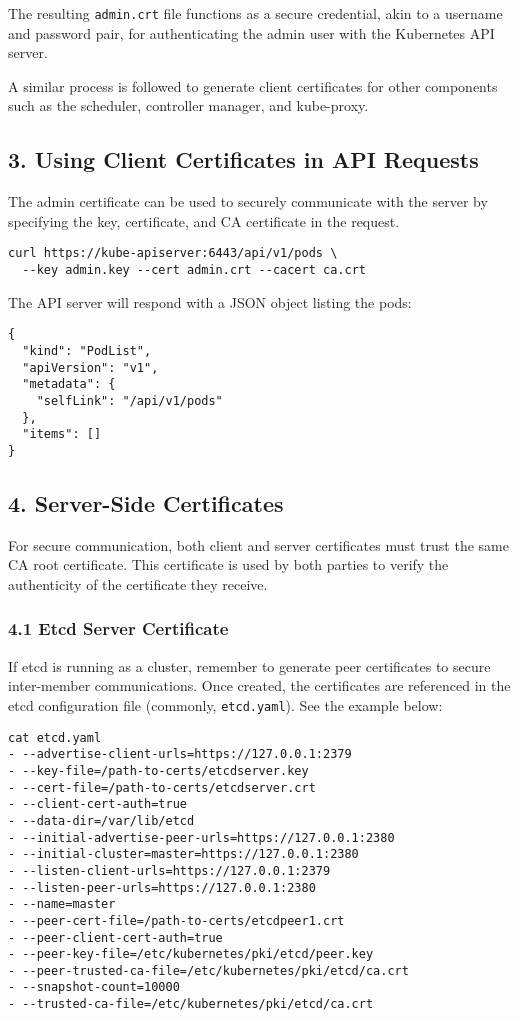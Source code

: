 \documentclass[11pt]{article}
\begin{document}
The resulting \texttt{admin.crt} file functions as a secure credential, akin to a username and password pair, for authenticating the admin user with the Kubernetes API server.

A similar process is followed to generate client certificates for other components such as the scheduler, controller manager, and kube-proxy.
\subsection{3. Using Client Certificates in API Requests}
\label{sec:org5bcc6ec}
The admin certificate can be used to securely communicate with the server by specifying the key, certificate, and CA certificate in the request.

\begin{verbatim}
curl https://kube-apiserver:6443/api/v1/pods \
  --key admin.key --cert admin.crt --cacert ca.crt
\end{verbatim}

The API server will respond with a JSON object listing the pods:

\begin{verbatim}
{
  "kind": "PodList",
  "apiVersion": "v1",
  "metadata": {
    "selfLink": "/api/v1/pods"
  },
  "items": []
}
\end{verbatim}
\subsection{4. Server-Side Certificates}
\label{sec:orgb26a536}
For secure communication, both client and server certificates must trust the same CA root certificate. This certificate is used by both parties to verify the authenticity of the certificate they receive.
\subsubsection{4.1 Etcd Server Certificate}
\label{sec:org515ada5}
If etcd is running as a cluster, remember to generate peer certificates to secure inter-member communications. Once created, the certificates are referenced in the etcd configuration file (commonly, \texttt{etcd.yaml}). See the example below:

\begin{verbatim}
cat etcd.yaml
- --advertise-client-urls=https://127.0.0.1:2379
- --key-file=/path-to-certs/etcdserver.key
- --cert-file=/path-to-certs/etcdserver.crt
- --client-cert-auth=true
- --data-dir=/var/lib/etcd
- --initial-advertise-peer-urls=https://127.0.0.1:2380
- --initial-cluster=master=https://127.0.0.1:2380
- --listen-client-urls=https://127.0.0.1:2379
- --listen-peer-urls=https://127.0.0.1:2380
- --name=master
- --peer-cert-file=/path-to-certs/etcdpeer1.crt
- --peer-client-cert-auth=true
- --peer-key-file=/etc/kubernetes/pki/etcd/peer.key
- --peer-trusted-ca-file=/etc/kubernetes/pki/etcd/ca.crt
- --snapshot-count=10000
- --trusted-ca-file=/etc/kubernetes/pki/etcd/ca.crt
\end{verbatim}
\end{document}
